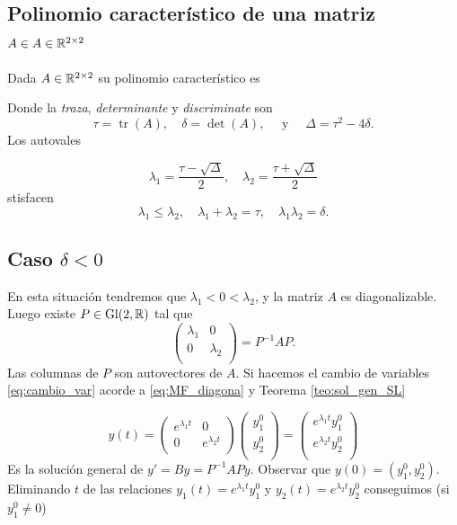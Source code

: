 \subsection{Polinomio característico de una matriz $A\in A\in\mathbb{R}^{2\times 2}$}

Dada $A\in\mathbb{R}^{2\times 2}$ su polinomio característico es


Donde la \emph{traza}, \emph{determinante} y \emph{discriminate} son 
\[
\tau=\operatorname{tr}(A), \quad \delta=\det(A),\quad \text { y }\quad \Delta=\tau^{2}-4 \delta. 
\]
Los autovales 

\[
\lambda_1=\frac{\tau - \sqrt{\Delta}}{2}, \quad \lambda_2=\frac{\tau + \sqrt{\Delta}}{2}
\] 
stisfacen
\[
\lambda_1\leq\lambda_2,\quad \lambda_{1}+\lambda_{2}=\tau,\quad  \lambda_{1} \lambda_2=\delta.
\]


\subsection{Caso  $\delta<0$}

En esta situación tendremos que  $\lambda_{1}<0<\lambda_{2}$, y la matriz $A$ es diagonalizable. Luego existe $P\in \operatorname{Gl}(2,\mathbb{R})$ tal que 
\[
 \begin{pmatrix}
  \lambda_1 & 0\\
  0  & \lambda_2\\
 \end{pmatrix}
=P^{-1}AP.
\]
Las columnas de $P$ son autovectores de $A$. Si hacemos el cambio de variables \eqref{eq:cambio_var} acorde a \eqref{eq:MF_diagona} y Teorema \ref{teo:sol_gen_SL} 

\begin{equation}\label{eq:sillas1}
y(t)=\begin{pmatrix}
e^{\lambda_1 t} & 0 \\
0 & e^{\lambda_2 t}\\
\end{pmatrix}
\begin{pmatrix}
y_{1}^{0} \\
y_{2}^{0}\\
\end{pmatrix}
=
\begin{pmatrix}
e^{\lambda_1t} y_{1}^{0} \\
e^{\lambda_2 t} y_{2}^{0}\\
\end{pmatrix}
\end{equation}
Es la solución general de  $y'=By=P^{-1}APy$. Observar que $y(0)= (y_{1}^{0},
y_{2}^{0})$.  Eliminando $t$ de las relaciones $y_1(t)= e^{\lambda_1t} y_{1}^{0} $ y $y_2(t)=e^{\lambda_2 t} y_{2}^{0}$ conseguimos (si $y_{1}^{0} \neq 0$)

